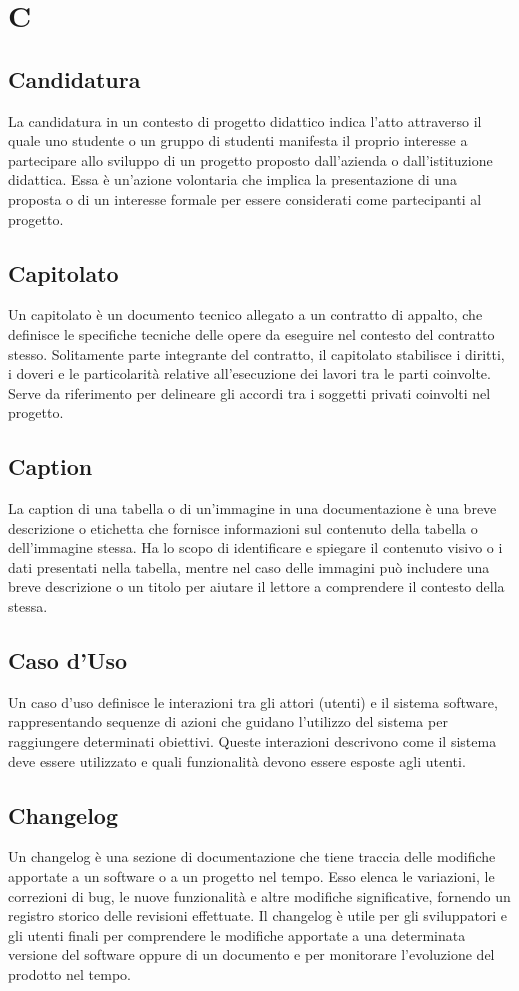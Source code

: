 \section{C} 
\subsection{Candidatura} 
La candidatura in un contesto di progetto didattico indica l'atto attraverso il quale uno studente o un gruppo di studenti manifesta il proprio interesse a partecipare allo sviluppo di un progetto proposto dall'azienda o dall'istituzione didattica. Essa è un'azione volontaria che implica la presentazione di una proposta o di un interesse formale per essere considerati come partecipanti al progetto.
\subsection{Capitolato} 
Un capitolato è un documento tecnico allegato a un contratto di appalto, che definisce le specifiche tecniche delle opere da eseguire nel contesto del contratto stesso. Solitamente parte integrante del contratto, il capitolato stabilisce i diritti, i doveri e le particolarità relative all'esecuzione dei lavori tra le parti coinvolte. Serve da riferimento per delineare gli accordi tra i soggetti privati coinvolti nel progetto.
\subsection{Caption} 
La caption di una tabella o di un'immagine in una documentazione è una breve descrizione o etichetta che fornisce informazioni sul contenuto della tabella o dell'immagine stessa. Ha lo scopo di identificare e spiegare il contenuto visivo o i dati presentati nella tabella, mentre nel caso delle immagini può includere una breve descrizione o un titolo per aiutare il lettore a comprendere il contesto della stessa.
\subsection{Caso d'Uso} 
Un caso d'uso definisce le interazioni tra gli attori (utenti) e il sistema software, rappresentando sequenze di azioni che guidano l'utilizzo del sistema per raggiungere determinati obiettivi. Queste interazioni descrivono come il sistema deve essere utilizzato e quali funzionalità devono essere esposte agli utenti.
\subsection{Changelog} 
Un changelog è una sezione di documentazione che tiene traccia delle modifiche apportate a un software o a un progetto nel tempo. Esso elenca le variazioni, le correzioni di bug, le nuove funzionalità e altre modifiche significative, fornendo un registro storico delle revisioni effettuate. Il changelog è utile per gli sviluppatori e gli utenti finali per comprendere le modifiche apportate a una determinata versione del software oppure di un documento e per monitorare l'evoluzione del prodotto nel tempo.

